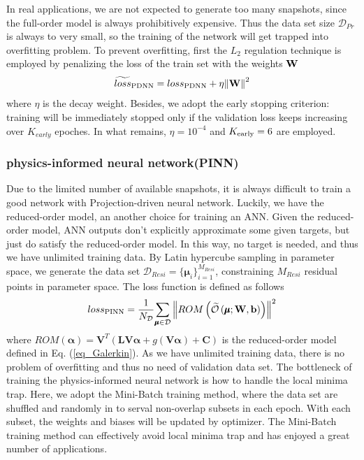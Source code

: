 \documentclass[preprint, 10pt]{elsarticle}
\begin{document}
In real applications, we are not expected to generate too many snapshots, since the full-order model is always prohibitively expensive. Thus the data set size $\mathcal{D}_{Pr}$ is always to very small, so the training of the network will get trapped into overfitting problem. To prevent overfitting, first the $L_2$ regulation technique is employed by penalizing the loss of the train set with the weights $\bf{W}$
\begin{equation}
\widetilde{loss}_{\rm{PDNN}}
 = loss_{\rm{PDNN}}
  + \eta {\left\| { \mathbf{W} } \right\|}^2
\end{equation}
where $\eta$ is the decay weight.
Besides, we adopt the early stopping criterion: training will be immediately stopped only if the validation loss keeps increasing over $K_{early}$ epoches. In what remains, $\eta=10^{-4}$ and $K_{\rm{early}}=6$ are employed.

\subsubsection{physics-informed neural network(PINN)}
Due to the limited number of available snapshots, it is always difficult to train a good network with Projection-driven neural network. Luckily, we have the reduced-order model, an another choice for training an ANN. Given the reduced-order model, ANN outputs don't explicitly approximate some given targets, but just do satisfy the reduced-order model. In this way, no target is needed, and thus we have unlimited training data. By Latin hypercube sampling in parameter space, we generate the data set $\mathcal{D}_{Resi}=\{ \pmb{\mu}_i\}_{i=1}^{M_{Resi}}$, constraining $M_{Resi}$ residual points in parameter space. The loss function is defined as follows
\begin{equation}
{loss}_{\rm{PINN}} = \frac{1}{N_{\cal D}}
{{\sum\limits_{\pmb\mu  \in {\cal D}}
{ \left\|
ROM \left(\widetilde {\cal O}\left( {\pmb\mu ;{\bf{W}},{\bf{b}}} \right) \right)
\right \|^2}
}}
\end{equation}
where $ROM(\pmb{\alpha})=\mathbf{V}^T
\left(
 \mathbf{L} \mathbf{V} \pmb{\alpha}
+ g         \left( \mathbf{V} \pmb{\alpha} \right)
+\mathbf{C}
\right)$
is the reduced-order model defined in Eq. (\ref{eq_Galerkin}).
As we have unlimited training data, there is no problem of overfitting and thus no need of validation data set.  The bottleneck of training the physics-informed neural network is how to handle the local minima trap. Here, we adopt the Mini-Batch training method, where the data set are shuffled and randomly in to serval non-overlap subsets in each epoch. With each subset, the weights and biases will be updated by optimizer. The Mini-Batch training method can effectively avoid local minima trap and has enjoyed a great number of applications.
\end{document}
